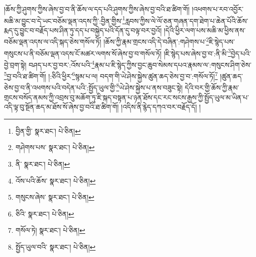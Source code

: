 །ཆོས་ཀྱི་ཤུགས་ཀྱིས་ཞེས་བྱ་བ་ནི་ཆོས་ལ་དད་པའི་ཤུགས་ཀྱིས་ཞེས་བྱ་བའི་ཐ་ཚིག་གོ། །འཕགས་པ་རབ་འབྱོར་མཆི་མ་བྱུང་བ་དེ་ཡང་བཅོམ་ལྡན་འདས་ཀྱི་:བྱིན་གྱིས་\footnote{བྱིན་གྱི་  སྣར་ཐང་།  པེ་ཅིན། }རླབས་ཀྱིས་ལེ་ལོ་ཅན་གཞན་དག་ཐེག་པ་ཆེན་པོའི་ཆོས་རྨད་དུ་བྱུང་བ་བརྗོད་པས་ཤིན་ཏུ་དད་པ་བསྐྱེད་པའི་དོན་དུ་བལྟ་བར་བྱའོ། །དེའི་ཕྱིར་ལག་པས་མཆི་མ་ཕྱིས་ནས་བཅོམ་ལྡན་འདས་ལ་འདི་སྐད་ཅེས་གསོལ་ཏོ། །ཆོས་ཀྱི་རྣམ་གྲངས་འདི་དེ་བཞིན་:གཤེགས་པ་\footnote{གཤེགས་པས་  སྣར་ཐང་།  པེ་ཅིན། }ཇི་སྙེད་པས་གསུངས་པ་ནི་བཅོམ་ལྡན་འདས་ངོ་མཚར་ལགས་སོ་ཞེས་བྱ་བ་གསོལ་ཏོ། །ཇི་སྙེད་པས་ཞེས་བྱ་བ་:ནི་མི་\footnote{ནི་  སྣར་ཐང་།  པེ་ཅིན། }བྱེད་པའི་བྱེ་བྲག་སྟེ། བཤད་པར་བྱ་བར་:འོས་པའི་\footnote{འོས་པའི་ཆོས་  སྣར་ཐང་།  པེ་ཅིན། }རྣམ་པ་ཇི་སྙེད་ཀྱིས་བྱང་ཆུབ་སེམས་དཔའ་རྣམས་ལ་:གསུངས་ཤིག་ཅེས་\footnote{གསུངས་ཞེས་  སྣར་ཐང་།  པེ་ཅིན། }བྱ་བའི་ཐ་ཚིག་གོ། །:ཅིའི་ཕྱིར་\footnote{ཅིའི་  སྣར་ཐང་།  པེ་ཅིན། }སྙམ་པ་ལ། བདག་གི་ཡེ་ཤེས་སྐྱེས་ཚུན་ཆད་ཅེས་བྱ་བ་:གསོལ་ཏོ།\footnote{གསོལ་ཏེ།  སྣར་ཐང་།  པེ་ཅིན། } །ཚུན་ཆད་ཅེས་བྱ་བ་ནི་འཕགས་པའི་བདེན་པའི་:སྤྱོད་ཡུལ་གྱི་\footnote{སྤྱོད་ཡུལ་བའི་  སྣར་ཐང་།  པེ་ཅིན། }ཡེ་ཤེས་སྐྱེས་པ་ནས་བཟུང་སྟེ། དེའི་བར་གྱི་ཆོས་ཀྱི་རྣམ་གྲངས་བསོད་ནམས་ཀྱི་འབྲས་བུ་མཆོག་ཏུ་ཇི་སྐད་བསྟན་པ་ཉན་ཐོས་དང་རང་སངས་རྒྱས་ཀྱི་སྤྱོད་ཡུལ་མ་ཡིན་པ་འདི་ལྟ་བུ་སྔོན་ཆད་མ་ཐོས་སོ་ཞེས་བྱ་བའི་ཐ་ཚིག་གོ། །འདིས་ནི་རྙེད་དཀའ་བར་བརྗོད་དོ། །
